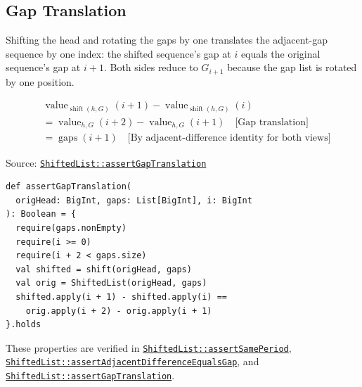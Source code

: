 \subsection{Gap Translation}

Shifting the head and rotating the gaps by one translates the
adjacent-gap sequence by one index: the shifted sequence's gap at $i$
equals the original sequence's gap at $i + 1$. Both sides reduce to
$G_{i+1}$ because the gap list is rotated by one position.

\begin{equation*}
\begin{aligned}
&\operatorname{value}_{\operatorname{shift}(h,G)}(i + 1) - \operatorname{value}_{\operatorname{shift}(h,G)}(i) \\
&= \operatorname{value}_{h,G}(i + 2) - \operatorname{value}_{h,G}(i + 1)
\quad \text{[Gap translation]} \\
&= \operatorname{gaps}(i + 1)
\quad \text{[By adjacent-difference identity for both views]}
\end{aligned}
\end{equation*}

Source:
\href{https://github.com/thiagomata/prime-numbers/blob/list-article-v1.0.0/src/main/scala/v1/chapter3/list/ShiftedList.scala}{\texttt{ShiftedList::assertGapTranslation}}

\begin{lstlisting}[style=scala]
def assertGapTranslation(
  origHead: BigInt, gaps: List[BigInt], i: BigInt
): Boolean = {
  require(gaps.nonEmpty)
  require(i >= 0)
  require(i + 2 < gaps.size)
  val shifted = shift(origHead, gaps)
  val orig = ShiftedList(origHead, gaps)
  shifted.apply(i + 1) - shifted.apply(i) ==
    orig.apply(i + 2) - orig.apply(i + 1)
}.holds
\end{lstlisting}

{\raggedright
These properties are verified in
\href{https://github.com/thiagomata/prime-numbers/blob/list-article-v1.0.0/src/main/scala/v1/chapter3/list/ShiftedList.scala}{\texttt{ShiftedList::\allowbreak assertSamePeriod}},
\href{https://github.com/thiagomata/prime-numbers/blob/list-article-v1.0.0/src/main/scala/v1/chapter3/list/ShiftedList.scala}{\texttt{ShiftedList::\allowbreak assertAdjacentDifferenceEqualsGap}},
and
\href{https://github.com/thiagomata/prime-numbers/blob/list-article-v1.0.0/src/main/scala/v1/chapter3/list/ShiftedList.scala}{\texttt{ShiftedList::\allowbreak assertGapTranslation}}.
\par}
